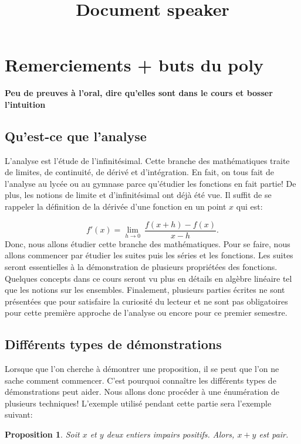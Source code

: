 \documentclass[a4paper, 12pt, french, twoside]{article}
\title{Document speaker}
\newtheorem{proposition}[theorem]{Proposition}
\begin{document}
\maketitle
\tableofcontents
\newpage
\section{Remerciements + buts du poly}

\textbf{Peu de preuves à l'oral, dire qu'elles sont dans le cours et bosser l'intuition}

\subsection{Qu'est-ce que l'analyse}

L'analyse est l'étude de l'infinitésimal. Cette branche des mathématiques traite de limites, de continuité, de dérivé et d'intégration. En fait, on tous fait de l'analyse au lycée ou au gymnase parce qu'étudier les fonctions en fait partie! De plus, les notions de limite et d'infinitésimal ont déjà été vue. Il suffit de se rappeler la définition de la dérivée d'une fonction en un point $x$ qui est: 

\begin{equation}
    f'(x)=\lim_{h\to 0}~\dfrac{f(x+h)-f(x)}{x-h}.
\end{equation}
Donc, nous allons étudier cette branche des mathématiques. Pour se faire, nous allons commencer par étudier les suites puis les séries et les fonctions. Les suites seront essentielles à la démonstration de plusieurs propriétées des fonctions. Quelques concepts dans ce cours seront vu plus en détails en algèbre linéaire tel que les notions sur les ensembles. Finalement, plusieurs parties écrites ne sont présentées que pour satisfaire la curiosité du lecteur et ne sont pas obligatoires pour cette première approche de l'analyse ou encore pour ce premier semestre. 




\subsection{Différents types de démonstrations}

Lorsque que l'on cherche à démontrer une proposition, il se peut que l'on ne sache comment commencer. C'est pourquoi connaître les différents types de démonstrations peut aider. Nous allons donc procéder à une énumération de plusieurs techniques!
L'exemple utilisé pendant cette partie sera l'exemple suivant:
\begin{proposition}
Soit $x$ et $y$ deux entiers impairs positifs. Alors, $x+y$ est pair.
\end{proposition}
\end{document}

